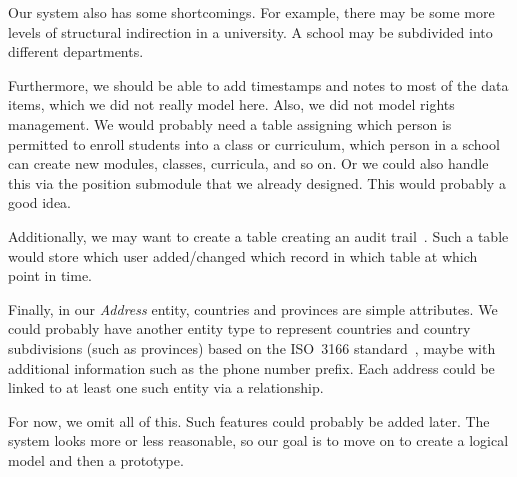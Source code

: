 Our system also has some shortcomings.
For example, there may be some more levels of structural indirection in a university.
A school may be subdivided into different departments.

Furthermore, we should be able to add timestamps and notes to most of the data items, which we did not really model here.
Also, we did not model rights management.
We would probably need a table assigning which person is permitted to enroll students into a class or curriculum, which person in a school can create new modules, classes, curricula, and so on.
Or we could also handle this via the position submodule that we already designed.
This would probably a good idea.

Additionally, we may want to create a table creating an audit trail~\cite{K2010ATTDCID}.
Such a table would store which user added/changed which record in which table at which point in time.

Finally, in our \emph{Address} entity, countries and provinces are simple attributes.
We could probably have another entity type to represent countries and country subdivisions (such as provinces) based on the ISO~3166 standard~\cite{ISO3166}, maybe with additional information such as the phone number prefix.
Each address could be linked to at least one such entity via a relationship.

For now, we omit all of this.
Such features could probably be added later.
The system looks more or less reasonable, so our goal is to move on to create a logical model and then a prototype.%
%
\FloatBarrier%
\endhsection%
%
